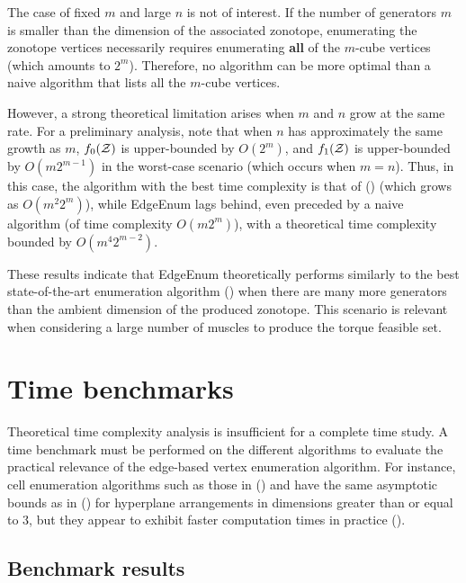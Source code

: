 The case of fixed $m$ and large $n$ is not of interest. If the number of generators $m$ is smaller than the dimension of the associated zonotope, enumerating the zonotope vertices necessarily requires enumerating \textbf{all} of the $m$-cube vertices (which amounts to $2^m$). Therefore, no algorithm can be more optimal than a naive algorithm that lists all the $m$-cube vertices.

However, a strong theoretical limitation arises when $m$ and $n$ grow at the same rate. For a preliminary analysis, note that when $n$ has approximately the same growth as $m$, $f_0(\mathcal{Z})$ is upper-bounded by $O(2^m)$, and $f_1(\mathcal{Z})$ is upper-bounded by $O(m2^{m-1})$ in the worst-case scenario (which occurs when $m=n$).
Thus, in this case, the algorithm with the best time complexity is that of (\cite{guCounterfactualIdentificationLatent2022}) (which grows as $O(m^2 2^m)$), while EdgeEnum lags behind, even preceded by a naive algorithm (of time complexity $O(m2^m)$), with a theoretical time complexity bounded by $O(m^4 2^{m-2})$. 

These results indicate that EdgeEnum theoretically performs similarly to the best state-of-the-art enumeration algorithm (\cite{guCounterfactualIdentificationLatent2022}) when there are many more generators than the ambient dimension of the produced zonotope. This scenario is relevant when considering a large number of muscles to produce the torque feasible set.

\section{Time benchmarks}
\label{time_benchmark}

Theoretical time complexity analysis is insufficient for a complete time study. A time benchmark must be performed on the different algorithms to evaluate the practical relevance of the edge-based vertex enumeration algorithm.
For instance, cell enumeration algorithms such as those in (\cite{radaNewAlgorithmEnumeration2018}) and \cite{guNonparametricMaximumLikelihood2020} have the same asymptotic bounds as in (\cite{avisPivotingAlgorithmConvex}) for hyperplane arrangements in dimensions greater than or equal to $3$, but they appear to exhibit faster computation times in practice (\cite{guCounterfactualIdentificationLatent2022}).

\subsection{Benchmark results}
\label{subsec:benchmark_results}

